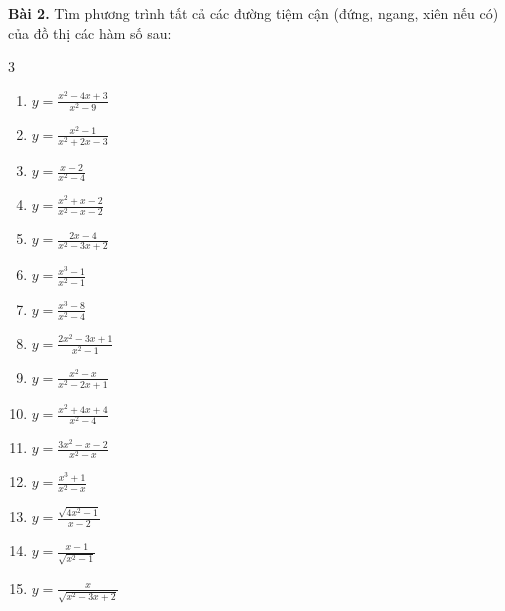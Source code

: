 \documentclass[12pt]{article}
\begin{document}
	\begin{btvang}
		\noindent \textbf{Bài 2.} Tìm phương trình tất cả các đường tiệm cận (đứng, ngang, xiên nếu có) của đồ thị các hàm số sau:
		\begin{multicols}{3}
			\begin{enumerate}[label=\textbf{\arabic*)}]
				\item $y = \frac{x^2 - 4x + 3}{x^2 - 9}$
				\item $y = \frac{x^2 - 1}{x^2 + 2x - 3}$
				\item $y = \frac{x - 2}{x^2 - 4}$
				\item $y = \frac{x^2 + x - 2}{x^2 - x - 2}$
				\item $y = \frac{2x - 4}{x^2 - 3x + 2}$
				\item $y = \frac{x^3 - 1}{x^2 - 1}$
				\item $y = \frac{x^3 - 8}{x^2 - 4}$
				\item $y = \frac{2x^2 - 3x + 1}{x^2 - 1}$
				\item $y = \frac{x^2 - x}{x^2 - 2x + 1}$
				\item $y = \frac{x^2 + 4x + 4}{x^2 - 4}$
				\item $y = \frac{3x^2 - x - 2}{x^2 - x}$
				\item $y = \frac{x^3 + 1}{x^2 - x}$
				\item $y = \frac{\sqrt{4x^2 - 1}}{x - 2}$
				\item $y = \frac{x - 1}{\sqrt{x^2 - 1}}$
				\item $y = \frac{x}{\sqrt{x^2 - 3x + 2}}$
			\end{enumerate}
		\end{multicols}
	\end{btvang}
	
	\vspace{0.8cm}
	
\end{document}
